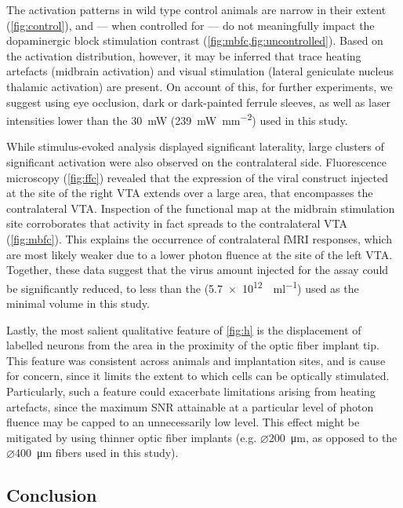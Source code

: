 The activation patterns in wild type control animals are narrow in their extent (\cref{fig:control}), and --- when controlled for --- do not meaningfully impact the dopaminergic block stimulation contrast (\cref{fig:mbfc,fig:uncontrolled}).
Based on the activation distribution, however, it may be inferred that trace heating artefacts (midbrain activation) and visual stimulation (lateral geniculate nucleus thalamic activation) are present.
On account of this, for further experiments, we suggest using eye occlusion, dark or dark-painted ferrule sleeves, as well as laser intensities lower than the \SI{30}{\milli\watt} (\SI{239}{\milli\watt\per\milli\meter\squared}) used in this study.

While stimulus-evoked analysis displayed significant laterality, large clusters of significant activation were also observed on the contralateral side.
Fluorescence microscopy (\cref{fig:ffc}) revealed that the expression of the viral construct injected at the site of the right VTA extends over a large area, that encompasses the contralateral VTA.
Inspection of the functional map at the midbrain stimulation site corroborates that activity in fact spreads to the contralateral VTA (\cref{fig:mbfc}).
This explains the occurrence of contralateral fMRI responses, which are most likely weaker due to a lower photon fluence at the site of the left VTA.
Together, these data suggest that the virus amount injected for the assay could be significantly reduced, to less than the
(\SI{5.7e12}{\vg\per\milli\litre})
used as the minimal volume in this study.

Lastly, the most salient qualitative feature of \cref{fig:h} is the displacement of labelled neurons from the area in the proximity of the optic fiber implant tip.
This feature was consistent across animals and implantation sites, and is cause for concern, since it limits the extent to which cells can be optically stimulated.
Particularly, such a feature could exacerbate limitations arising from heating artefacts, since the maximum SNR attainable at a particular level of photon fluence may be capped to an unnecessarily low level.
This effect might be mitigated by using thinner optic fiber implants (e.g. $\diameter$\SI{200}{\micro\meter}, as opposed to the $\diameter$\SI{400}{\micro\meter} fibers used in this study).

\subsection{Conclusion}

